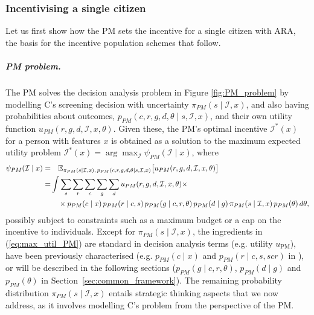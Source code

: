\documentclass[12pt]{article}
\begin{document}
\subsubsection{Incentivising a single citizen}\label{sec:single_patient}
Let us first show how the PM sets the incentive for a single citizen with ARA, the basis for the incentive population schemes that follow.
\subparagraph{PM problem.} The PM solves the decision analysis problem in Figure \ref{fig:PM_problem} by modelling C's screening decision with uncertainty $\pi_{PM}(s \mid \mathcal{I}, x)$, and also having probabilities about outcomes, $p_{PM}(c,r,g,d,\theta \mid s, \mathcal{I}, x)$, and their own utility function $u_{PM}(r,g,d,\mathcal{I},x, \theta)$. Given these, the PM's optimal incentive $\mathcal{I}^*(x)$ for a person with features $x$ is obtained as a solution to the maximum expected utility problem $\mathcal{I}^* (x)  =  \arg \max_{\mathcal{I}} \psi_{PM}(\mathcal{I} \mid x)$, where
\begin{align} \label{eq:max_util_PM}
  \psi_{PM}(\mathcal{I} \mid x) = & \quad \mathbb{E}_{\pi_{PM}(s \mid \mathcal{I}, x),\, p_{PM}(c,r,g,d,\theta \mid s, \mathcal{I}, x)} \big[u_{PM}(r,g,d,\mathcal{I},x, \theta)\big] \\
     = & \int \sum_{s} \sum_{r} \sum_{c} \sum_{g} \sum_{d} u_{PM}(r,g,d,\mathcal{I},x, \theta) \times \notag \\
    & \quad \times p_{PM}(c \mid x)\, p_{PM}(r \mid c,s)\, p_{PM}(g \mid c,r,\theta)\, p_{PM}(d \mid g)\, \pi_{PM}(s \mid \mathcal{I},x)\, p_{PM}(\theta) \, d\theta, \notag
\end{align}
possibly subject to constraints such as a maximum budget or a cap on the incentive to individuals. Except for $\pi_{PM}(s \mid \mathcal{I}, x)$, the ingredients in (\ref{eq:max_util_PM}) are standard in decision analysis terms \citep{french} (e.g. utility $u_{\text{PM}}$),  have been previously characterised (e.g. $p_{PM}(c \mid x)$ and $p_{PM}(r \mid c,s,scr)$ in \cite{corrales2024colorectal, corrales2025decision}), or will be described in the following sections ($p_{PM}(g \mid c,r,\theta)$, $p_{PM}(d \mid g)$ and $p_{PM}(\theta)$ in Section~\ref{sec:common_framework}). The remaining probability distribution $\pi_{PM}(s \mid \mathcal{I}, x)$ entails strategic thinking aspects that we now address, as it involves modelling C's problem from the perspective of the PM.
\end{document}
